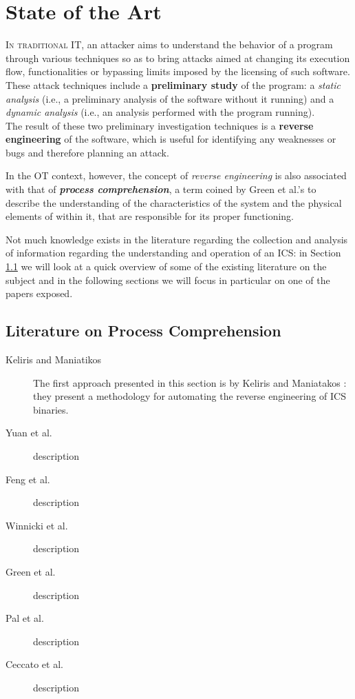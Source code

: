 \chapter{State of the Art}
\label{state_of_art}
\linenumbers

\lettrine[lines=2]{I}{n traditional IT}, an attacker aims to understand the behavior of a program through various techniques so as to bring attacks aimed at changing its execution flow, functionalities or bypassing limits imposed by the licensing of such software. These attack techniques include a \textbf{preliminary study} of the program: a \textit{static analysis} (i.e., a preliminary analysis of the software without it running) and a \textit{dynamic analysis} (i.e., an analysis performed with the program running).\\
The result of these two preliminary investigation techniques is a \textbf{reverse engineering} of the software, which is useful for identifying any weaknesses or bugs and therefore planning an attack.

\bigskip
In the OT context, however, the concept of \textit{reverse engineering} is also associated with that of \textit{\textbf{process comprehension}}, a term coined by Green et al.'s \cite{proc_compr_green} to describe the understanding of the characteristics of the system and the physical elements of within it, that are responsible for its proper functioning.

\bigskip
Not much knowledge exists in the literature regarding the collection and analysis of information regarding the understanding and operation of an ICS: in Section \ref{sec:related_work} we will look at a quick overview of some of the existing literature on the subject and in the following sections we will focus in particular on one of the papers exposed.

\vfill

\section{Literature on Process Comprehension}
\label{sec:related_work}
\begin{description}
	\item[Keliris and Maniatikos] The first approach presented in this section is by Keliris and Maniatakos \cite{keliris_maniatakos}: they present a methodology for automating the reverse engineering of ICS binaries.
	
	\item[Yuan et al.] description
	
	\item[Feng et al.] description
	
	\item[Winnicki et al.] description
	
	\item[Green et al.] description
	
	\item[Pal et al.] description
	
	\item[Ceccato et al.] description
\end{description}

